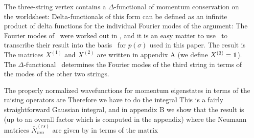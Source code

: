 
The three-string vertex contains a $\Delta$-functional of
momentum conservation on the worldsheet:
\eqn{}
Delta-functionals of this form can be defined as an infinite
product of delta functions for the individual Fourier modes of the argument:
\eqn{}
The Fourier modes of \Deltapone\ were worked out in
\GSB, and it is
an easy matter to use \transcribe\ to transcribe their result into
the basis \xandp\ for $p(\sigma)$ used in this paper.
The result is
\eqn{}
The matrices $X^{(1)}$ and $X^{(2)}$ are written in appendix A (we
define $X^{(3)} = {\bf 1}$).
The $\Delta$-functional \Deltap\  determines
the Fourier modes of the third string  in terms of the modes of the 
other two strings.


The properly normalized wavefunctions for momentum eigenstates
in terms of the raising operators are
\eqn{}
Therefore we have to do
the integral
\eqn{}
This is a fairly straightforward Gaussian integral, and in appendix
B we show that the result is
(up to an overall factor which is computed in the appendix)
\eqn{}
where the Neumann matrices $\overline{N}^{(rs)}_{mn}$ are given by
\eqn{}
in terms of the matrix
\eqn{}

